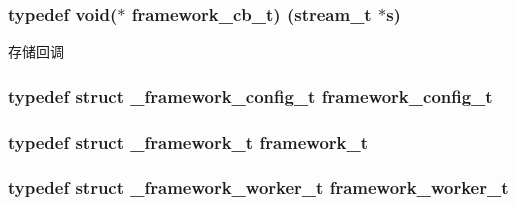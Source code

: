 \subsubsection[{framework\+\_\+cb\+\_\+t}]{\setlength{\rightskip}{0pt plus 5cm}typedef void($\ast$ framework\+\_\+cb\+\_\+t) ({\bf stream\+\_\+t} $\ast$s)}\label{a00047_a4252553890b97d1b0869581b40e11c3e_a4252553890b97d1b0869581b40e11c3e}
存储回调 \hypertarget{a00047_a55b26efa9e6ee05514d087ba2593a54b_a55b26efa9e6ee05514d087ba2593a54b}{}
\subsubsection[{framework\+\_\+config\+\_\+t}]{\setlength{\rightskip}{0pt plus 5cm}typedef struct {\bf \+\_\+framework\+\_\+config\+\_\+t} {\bf framework\+\_\+config\+\_\+t}}\label{a00047_a55b26efa9e6ee05514d087ba2593a54b_a55b26efa9e6ee05514d087ba2593a54b}
\hypertarget{a00047_a6149d769f6f07ed14a40a271c95d8463_a6149d769f6f07ed14a40a271c95d8463}{}
\subsubsection[{framework\+\_\+t}]{\setlength{\rightskip}{0pt plus 5cm}typedef struct {\bf \+\_\+framework\+\_\+t} {\bf framework\+\_\+t}}\label{a00047_a6149d769f6f07ed14a40a271c95d8463_a6149d769f6f07ed14a40a271c95d8463}
\hypertarget{a00047_aeb7a44e6b579659a8aae81f3ab819af3_aeb7a44e6b579659a8aae81f3ab819af3}{}
\subsubsection[{framework\+\_\+worker\+\_\+t}]{\setlength{\rightskip}{0pt plus 5cm}typedef struct {\bf \+\_\+framework\+\_\+worker\+\_\+t} {\bf framework\+\_\+worker\+\_\+t}}\label{a00047_aeb7a44e6b579659a8aae81f3ab819af3_aeb7a44e6b579659a8aae81f3ab819af3}
\hypertarget{a00047_a5dcd1ed9242185e4448352748e58573d_a5dcd1ed9242185e4448352748e58573d}{}
